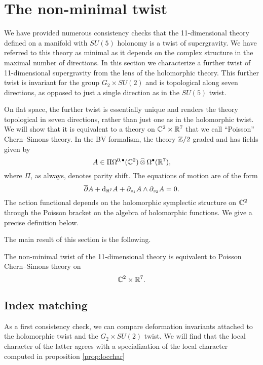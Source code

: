 \section{The non-minimal twist} 

We have provided numerous consistency checks that the 11-dimensional theory defined on a manifold with $SU(5)$ holonomy is a twist of supergravity. 
We have referred to this theory as minimal as it depends on the complex structure in the maximal number of directions. 
In this section we characterize a further twist of 11-dimensional supergravity from the lens of the holomorphic theory.  
This further twist is invariant for the group $G_2 \times SU(2)$ and is topological along seven directions, as opposed to just a single direction as in the $SU(5)$ twist. 

On flat space, the further twist is essentially unique and renders the theory topological in seven directions, rather than just one as in the holomorphic twist. 
We will show that it is equivalent to a theory on $\mathbb C^2 \times \mathbb R^7$ that we call ``Poisson'' Chern--Simons theory. 
In the BV formalism, the theory $\mathbb Z/2$ graded and has fields given by
\[
A \in \Pi \Omega^{0,\bullet}(\mathbb C^2) \, \widehat{\otimes} \, \Omega^\bullet(\mathbb R^7) ,
\]
where $\Pi$, as always, denotes parity shift.
The equations of motion are of the form
\[
\overline{\partial} A + {\rm d}_{\mathbb R^7} A + \partial_{z_1} A \wedge \partial_{z_2} A = 0 .
\]
The action functional depends on the holomorphic symplectic structure on $\mathbb C^2$ through the Poisson bracket on the algebra of holomorphic functions.
We give a precise definition below. 

The main result of this section is the following.

\begin{thm}
\label{thm:nonmin}
The non-minimal twist of the 11-dimensional theory is equivalent to Poisson Chern--Simons theory on 
\[
\mathbb C^2 \times \mathbb R^7 .
\]
\end{thm}

\subsection{Index matching}
\label{sec:indexcheck}

As a first consistency check, we can compare deformation invariants attached to the holomorphic twist and the $G_2\times SU(2)$ twist. %
We will find that the local character of the latter agrees with a specialization of the local character computed in proposition \ref{prop:locchar}

